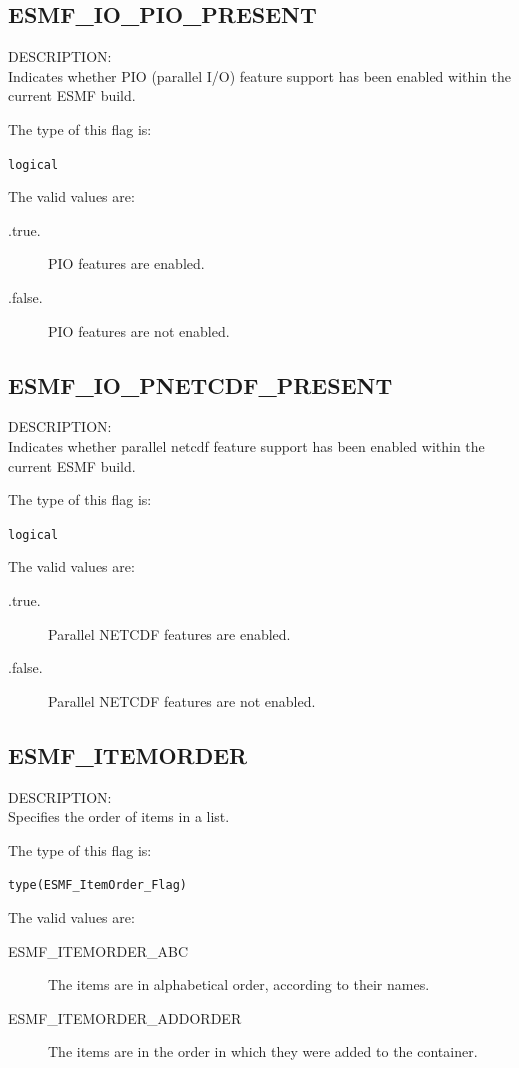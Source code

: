 \subsection{ESMF\_IO\_PIO\_PRESENT}
\label{const:iopioflag}
{\sf DESCRIPTION:\\}
Indicates whether PIO (parallel I/O) feature support has been enabled
within the current ESMF build.

The type of this flag is:

{\tt logical}

The valid values are:
\begin{description}
 \item [.true.]
      PIO features are enabled.
\item [.false.]
      PIO  features are not enabled.
\end{description}

\subsection{ESMF\_IO\_PNETCDF\_PRESENT}
\label{const:iopnetcdfflag}
{\sf DESCRIPTION:\\}
Indicates whether parallel netcdf feature support has been enabled
within the current ESMF build.

The type of this flag is:

{\tt logical}

The valid values are:
\begin{description}
\item [.true.]
      Parallel NETCDF features are enabled.
\item [.false.]
      Parallel NETCDF features are not enabled.
\end{description}


\subsection{ESMF\_ITEMORDER}
\label{const:itemorderflag}
{\sf DESCRIPTION:\\}  
Specifies the order of items in a list.

The type of this flag is:

{\tt type(ESMF\_ItemOrder\_Flag)}

The valid values are:
\begin{description}

\item [ESMF\_ITEMORDER\_ABC]
         The items are in alphabetical order, according to their names.
\item [ESMF\_ITEMORDER\_ADDORDER]
         The items are in the order in which they were added to the container.
\end{description}


